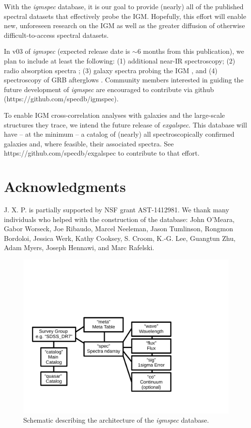 \documentclass[12pt]{elsarticle}
\begin{document}
With the {\it igmspec} database, it is our goal to provide (nearly)
all of the published spectral datasets that effectively
probe the IGM.  Hopefully, this effort will
enable new, unforeseen research on the IGM as well
as the greater diffusion of otherwise difficult-to-access spectral
datasets.  

In v03 of
{\it igmspec} (expected release date is $\sim 6$ months from
this publication), we plan to include at least the following:
(1) additional near-IR spectroscopy;
(2) radio absorption spectra \citep[e.g. 21\,cm;][]{kanekar+14};
(3) galaxy spectra probing the IGM \citep[e.g.][]{rpk+10}, 
and
(4) spectroscopy of GRB afterglows \citep[e.g.][]{fjp+09}.
Community members interested in guiding the future development
of {\it igmspec} are encouraged to contribute via github
(https://github.com/specdb/igmspec).

To enable IGM cross-correlation analyses with galaxies
and the large-scale structures they trace,
we intend the future release of {\it exgalspec}.
This database will have -- at
the minimum -- a catalog of (nearly) all spectroscopically
confirmed galaxies and, where feasible, their associated
spectra.  See https://github.com/specdb/exgalspec
to contribute to that effort.


\section{Acknowledgments}

J. X. P. is partially supported by NSF grant AST-1412981.
We thank many individuals who helped with the construction
of the database:
John O'Meara, Gabor Worseck, Joe Ribaudo, Marcel Neeleman,
Jason Tumlinson, Rongmon Bordoloi, Jessica Werk,
Kathy Cooksey, S. Croom, K.-G. Lee, Guangtun Zhu,
Adam Myers, Joseph Hennawi,  and Marc Rafelski.




%


%
%


\begin{figure}
\includegraphics[width=6in]{architecture_v02.pdf}
\caption{Schematic describing the architecture of 
the {\it igmspec} database.
}
\label{fig:arch}
\end{figure}
\end{document}
